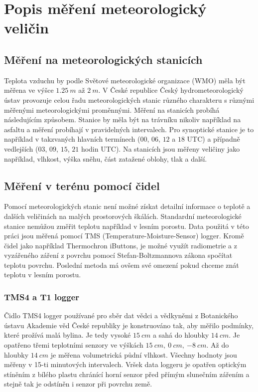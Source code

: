 \section{Popis měření meteorologický veličin} \label{chap:measure}
\subsection{Měření na meteorologických stanicích}
Teplota vzduchu by podle Světové meteorologické organizace (WMO) měla být měřena ve výšce $\SI{1.25}{m}$ až $\SI{2}{m}$\cite{wmoGuidance2021}. V České republice Český hydrometeorologický ústav provozuje celou řadu meteorologických stanic různého charakteru s různými měřenými meteorologickými proměnnými. Měření na stanicích probíhá následujícím způsobem. Stanice by měla být na trávníku nikoliv například na asfaltu a měření probíhají v pravidelných intervalech. Pro synoptické stanice je to například v takzvaných hlavních termínech ($00$, $06$, $12$ a $18$ UTC) a případně vedlejších ($03$, $09$, $15$, $21$ hodin UTC). Na stanicích jsou měřeny veličiny jako například, vlhkost, výška sněhu, část zatažené oblohy, tlak a další\cite{chmustanice}. 

\subsection{Měření v terénu pomocí čidel}
Pomocí meteorologických stanic není možné získat detailní informace o teplotě a dalších veličinách na malých prostorových škálách. Standardní meteorologické stanice nemůžou změřit teplotu například v lesním porostu. Data použitá v této práci jsou měřená pomocí TMS (Temperature-Moisture-Sensor) logger. Kromě čidel jako například Thermochron iButtons, je možné využít radiometrie a z vyzářeného záření z povrchu pomocí Stefan-Boltzmannova zákona spočítat teplotu povrchu. Poslední metoda má ovšem své omezení pokud chceme znát teplotu v lesním porostu. 

\subsubsection{TMS4 a T1 logger} \label{chap:loggers}
Čidlo TMS4 logger používané pro sběr dat vědci a vědkyněmi z Botanického ústavu Akademie věd České republiky je konstruováno tak, aby měřilo podmínky, které prožívá malá bylina. Je tedy vysoké $\SI{15}{cm}$ a sahá do hloubky $\SI{14}{cm}$. Je opatřeno třemi teplotními senzory ve výškách $\SI{15}{cm},\ \SI{0}{cm},\ \SI{-8}{cm}$. Až do hloubky $\SI{14}{cm}$ je měřena volumetrická půdní vlhkost. Všechny hodnoty jsou měřeny v 15-ti minutových intervalech. Vršek data loggeru je opatřen optickým stíněním z bílého plastu chránící horní senzor před přímým slunečním zářením a stejně tak je odstíněn i senzor při povrchu země. 

